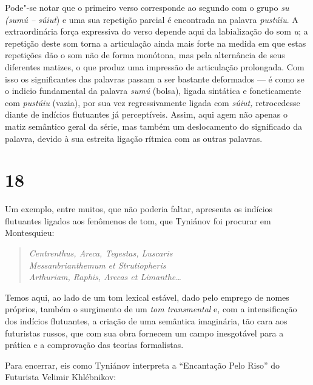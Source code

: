 Pode"-se notar que o primeiro verso corresponde ao segundo com o grupo
\emph{su (sumú -- súiut}) e uma sua repetição parcial é encontrada na
palavra \emph{pustúiu}. A extraordinária força expressiva do verso
depende aqui da labialização do som \emph{u}; a repetição deste som torna a
articulação ainda mais forte na medida em que estas repetições dão o som
não de forma monótona, mas pela alternância de seus diferentes matizes,
o que produz uma impressão de articulação prolongada. Com isso os
significantes das palavras passam a ser bastante deformados --- é como se
o indicio fundamental da palavra \emph{sumú} (bolsa), ligada sintática e
foneticamente com \emph{pustúiu} (vazia), por sua vez regressivamente
ligada com \emph{súiut,} retrocedesse diante de indícios flutuantes já
perceptíveis. Assim, aqui agem não apenas o matiz semântico geral da
série, mas também um deslocamento do significado da palavra, devido à
sua estreita ligação rítmica com as outras palavras.

\section{18}

Um exemplo, entre muitos, que não poderia faltar, apresenta os indícios
flutuantes ligados aos fenômenos de tom, que Tyniánov foi procurar em
Montesquieu:

\begin{verse}
\emph{Centrenthus, Areca, Tegestas, Luscaris} \\
\emph{Messanbrianthemum et Strutiopheris} \\
\emph{Arthuriam, Raphis, Arecas et Limanthe\ldots{}}
\end{verse}

Temos aqui, ao lado de um tom lexical estável, dado pelo emprego de
nomes próprios, também o surgimento de um \emph{tom transmental} e, com
a intensificação dos indícios flutuantes, a criação de uma semântica
imaginária, tão cara aos futuristas russos, que com sua obra fornecem um
campo inesgotável para a prática e a comprovação das teorias
formalistas.

Para encerrar, eis como Tyniánov interpreta a ``Encantação Pelo Riso''
do Futurista Velimir Khlébnikov:

